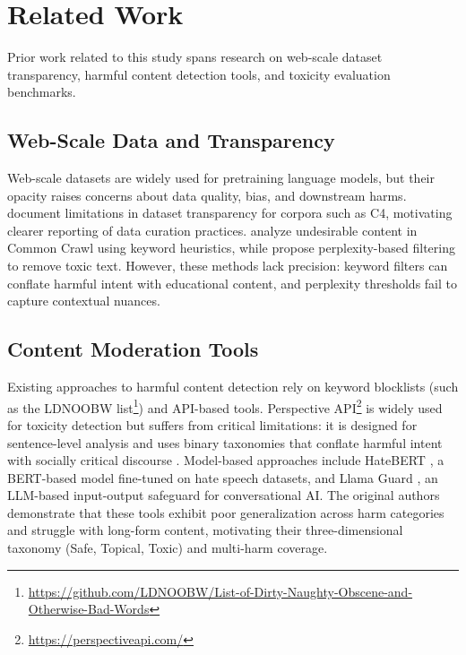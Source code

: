 \documentclass[10pt]{article} %
\begin{document}
\section{Related Work}

Prior work related to this study spans research on web-scale dataset transparency, harmful content detection tools, and toxicity evaluation benchmarks.

\subsection{Web-Scale Data and Transparency}

Web-scale datasets are widely used for pretraining language models, but their opacity raises concerns about data quality, bias, and downstream harms. \citet{dodge2021c4} document limitations in dataset transparency for corpora such as C4, motivating clearer reporting of data curation practices. \citet{luccioni2021whatsinthebox} analyze undesirable content in Common Crawl using keyword heuristics, while \citet{jansen2022perplexity} propose perplexity-based filtering to remove toxic text. However, these methods lack precision: keyword filters can conflate harmful intent with educational content, and perplexity thresholds fail to capture contextual nuances.

\subsection{Content Moderation Tools}

Existing approaches to harmful content detection rely on keyword blocklists (such as the LDNOOBW list\footnote{\url{https://github.com/LDNOOBW/List-of-Dirty-Naughty-Obscene-and-Otherwise-Bad-Words}}) and API-based tools. Perspective API\footnote{\url{https://perspectiveapi.com/}} is widely used for toxicity detection but suffers from critical limitations: it is designed for sentence-level analysis and uses binary taxonomies that conflate harmful intent with socially critical discourse \citep{mendu2025saferpretraining}. Model-based approaches include HateBERT \citep{caselli2021hatebert}, a BERT-based model fine-tuned on hate speech datasets, and Llama Guard \citep{inan2023llamaguard}, an LLM-based input-output safeguard for conversational AI. The original authors demonstrate that these tools exhibit poor generalization across harm categories and struggle with long-form content, motivating their three-dimensional taxonomy (Safe, Topical, Toxic) and multi-harm coverage.
\end{document}
